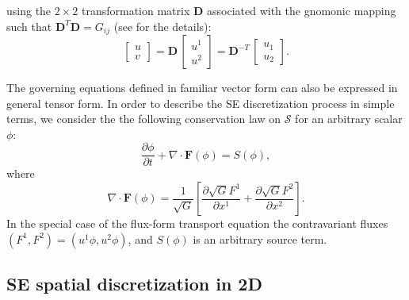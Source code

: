 \documentclass{agujournal}
\begin{document}
 using the  $2 \times 2$ transformation matrix  $\mathbf{D}$ associated with the gnomonic mapping 
 such that   $\mathbf{D}^T\mathbf{D} = G_{ij}$ (see \cite{NTL2005MWR} for the details):  
    \begin{equation}
     \left[   \begin{array}{c}
               u \\ v
             \end{array}
           \right]
           =
     \mathbf{D}  \, \left[   \begin{array}{c}
               u^1 \\ u^2
             \end{array}
           \right] =
            \mathbf{D}^{-T}  \, \left[   \begin{array}{c}
               u_1 \\ u_2
             \end{array}
           \right]. 
          \label{eq:covcontra} 
\end{equation}

 The governing equations defined in familiar vector form can also be expressed 
 in  general tensor form. In order  to  describe the SE discretization process in simple terms, we consider the 
 the following conservation law  on $\mathcal{S}$ for an arbitrary  scalar $\phi$:  
 \begin{equation}
 \frac{\partial \phi }{\partial t}  + \nabla \cdot \mathbf{F}(\phi)  = S(\phi),
 \label{eq:se1} 
 \end{equation}
where 
\begin{equation}
   \nabla \cdot \mathbf{F}(\phi) = \frac{1}{\sqrt{G}} \left[   \frac{\partial  \sqrt{G} F^1}{\partial x^1}  + 
   \frac{\partial  \sqrt{G} F^2}{\partial x^2}      \right] .  
   \end{equation} 
In the special case of the flux-form transport equation the
   contravariant fluxes $(F^1, F^2) = (u^1 \phi , u^2 \phi)$, and $S(\phi)$  is an arbitrary source term.


\subsection{\normalsize SE spatial discretization in 2D}
\end{document}
